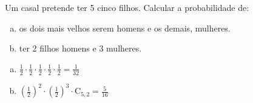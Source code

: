 \begin{ex}
Um casal pretende ter 5 cinco filhos. Calcular a probabilidade de:
   \begin{enumerate}[(a)]
   \item os dois mais velhos serem homens e os demais, mulheres.
   \item ter 2 filhos homens e 3 mulheres.
   \end{enumerate}
     \begin{sol}
       \phantom{A}
       \begin{enumerate} [(a)]
           \item $\frac{1}{2}\cdot\frac{1}{2}\cdot\frac{1}{2}\cdot\frac{1}{2}\cdot\frac{1}{2}=\frac{1}{32}$
           \item $(\frac{1}{2})^2\cdot(\frac{1}{2})^3\cdot\mathrm{C}_{5,2}=\frac{5}{16}$
       \end{enumerate}
     \end{sol}
\end{ex}